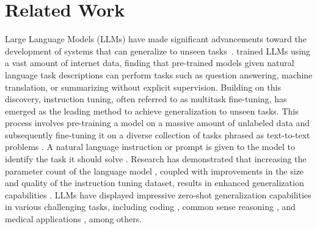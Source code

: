 \section{Related Work}
Large Language Models (LLMs) have made significant advancements toward the development of systems that can generalize to unseen tasks~\citep{10.1145/3605943}. \citet{radford2019language} trained LLMs using a vast amount of internet data, finding that pre-trained models given natural language task descriptions can perform tasks such as question answering, machine translation, or summarizing without explicit supervision. Building on this discovery, instruction tuning, often referred to as multitask fine-tuning, has emerged as the leading method to achieve generalization to unseen tasks. This process involves pre-training a model on a massive amount of unlabeled data and subsequently fine-tuning it on a diverse collection of tasks \citep{DBLP:conf/emnlp/WangMAKMNADASPK22,DBLP:journals/corr/abs-2210-11416} phrased as text-to-text problems \citep{DBLP:journals/jmlr/RaffelSRLNMZLL20}. A natural language instruction or prompt is given to the model to identify the task it should solve \citep{DBLP:conf/eacl/SchickS21,DBLP:conf/naacl/ScaoR21}. Research has demonstrated that increasing the parameter count of the language model \citep{DBLP:conf/nips/BrownMRSKDNSSAA20}, coupled with improvements in the size and quality of the instruction tuning dataset, results in enhanced generalization capabilities \citep{DBLP:journals/corr/abs-2302-12692,DBLP:journals/corr/abs-2205-01068,DBLP:journals/corr/abs-2204-02311,DBLP:conf/acl/MuennighoffWSRB23,DBLP:journals/corr/abs-2302-13971,DBLP:journals/corr/abs-2307-09288}. LLMs have displayed impressive zero-shot generalization capabilities in various challenging tasks, including coding \cite{wang2021gpt,black-etal-2022-gpt,DBLP:journals/corr/abs-2308-12950}, common sense reasoning \cite{DBLP:journals/corr/abs-2302-13971}, and medical applications \cite{singhal2023large}, among others. 

